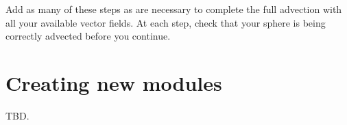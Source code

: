 Add as many of these steps as are necessary to complete the full
advection with all your available vector fields.  At each step, check
that your sphere is being correctly advected before you continue.

\chapter{Creating new modules}
TBD.

%

%
\setfooter{\thepage}{}{}{}{}{\thepage}%
\printindex%


